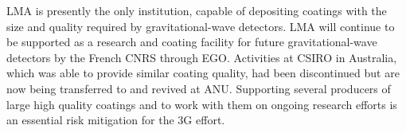 LMA is presently the only institution, capable of depositing coatings with the size and quality required by gravitational-wave detectors. LMA will continue to be supported as a research and coating facility for future gravitational-wave detectors by the French CNRS through EGO. Activities at CSIRO in Australia, which was able to provide similar coating quality, had been discontinued but are now being transferred to and revived at ANU. Supporting several producers of large high quality coatings and to work with them on ongoing research efforts is an essential risk mitigation for the 3G effort.







